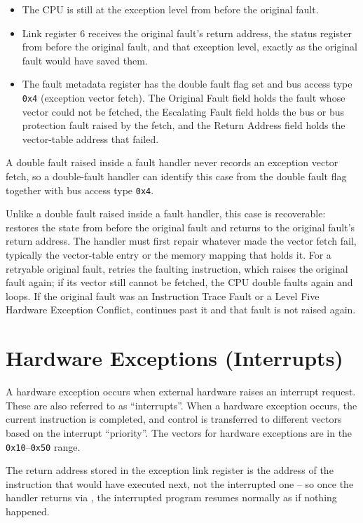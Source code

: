 \begin{itemize}
	\item The CPU is still at the exception level from before the original fault.
	\item Link register 6 receives the original fault's return address, the status register from before the original fault, and
	      that exception level, exactly as the original fault would have saved them.
	\item The fault metadata register has the double fault flag set and bus access type \texttt{0x4} (exception vector fetch).
	      The Original Fault field holds the fault whose vector could not be fetched, the Escalating Fault field holds the bus or
	      bus protection fault raised by the fetch, and the Return Address field holds the vector-table address that failed.
\end{itemize}

A double fault raised inside a fault handler never records an exception vector fetch, so a double-fault handler can
identify this case from the double fault flag together with bus access type \texttt{0x4}.

Unlike a double fault raised inside a fault handler, this case is recoverable:  restores the state from
before the original fault and returns to the original fault's return address. The handler must first repair whatever
made the vector fetch fail, typically the vector-table entry or the memory mapping that holds it. For a retryable
original fault,  retries the faulting instruction, which raises the original fault again; if its vector
still cannot be fetched, the CPU double faults again and loops. If the original fault was an Instruction Trace Fault or
a Level Five Hardware Exception Conflict,  continues past it and that fault is not raised again.

\section{Hardware Exceptions (Interrupts)}

A hardware exception occurs when external hardware raises an interrupt request. These are also referred to as
``interrupts''. When a hardware exception occurs, the current instruction is completed, and control is transferred to
different vectors based on the interrupt ``priority''. The vectors for hardware exceptions are in the
\texttt{0x10}--\texttt{0x50} range.

The return address stored in the exception link register is the address of the instruction that would have executed
next, not the interrupted one -- so once the handler returns via , the interrupted program resumes
normally as if nothing happened.

